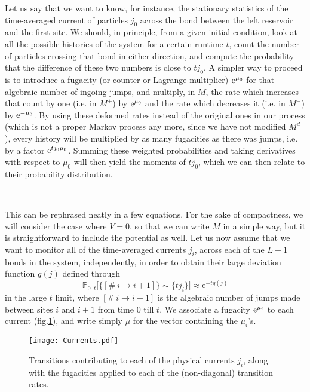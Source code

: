 \documentclass[aps,pre,onecolumn,showpacs,showkeys,a4paper]{revtex4-1}
\begin{document}
Let us say that we want to know, for instance, the stationary statistics of the time-averaged current of particles $j_0$ across the bond between the left reservoir and the first site. We should, in principle, from a given initial condition, look at all the possible histories of the system for a certain runtime $t$, count the number of particles crossing that bond in either direction, and compute the probability that the difference of these two numbers is close to $t j_0$. A simpler way to proceed is to introduce a fugacity (or counter or Lagrange multiplier) ${\rm e}^{\mu_0}$ for that algebraic number of ingoing jumps, and multiply, in $M$, the rate which increases that count by one (i.e. in $M^+$) by ${\rm e}^{\mu_0}$ and the rate which decreases it (i.e. in $M^-$) by ${\rm e}^{-\mu_0}$. By using these deformed rates instead of the original ones in our process (which is not a proper Markov process any more, since we have not modified $M^d$), every history will be multiplied by as many fugacities as there was jumps, i.e. by a factor ${\rm e}^{t j_0 \mu_0}$. Summing these weighted probabilities and taking derivatives with respect to $\mu_0$ will then yield the moments of $t j_0$, which we can then relate to their probability distribution.

~

This can be rephrased neatly in a few equations. For the sake of compactness, we will consider the case where $V=0$, so that we can write $M$ in a simple way, but it is straightforward to include the potential as well. Let us now assume that we want to monitor all of the time-averaged currents $j_i$, across each of the $L+1$ bonds in the system, independently, in order to obtain their large deviation function $g(j)$ defined through
\begin{equation}
\mathbb{P}_{0..t}\bigl[\{[\#~i\rightarrow i+1]\}\sim \{tj_i\}\bigr]\approx \mathrm{e}^{-tg(j)}
\end{equation}
in the large $t$ limit, where $[\#~i\rightarrow i+1]$ is the algebraic number of jumps made between sites $i$ and $i+1$ from time $0$ till $t$. We associate a fugacity ${\rm e}^{\mu_i}$ to each current (fig.\ref{Currents}), and write simply $\mu$ for the vector containing the $\mu_i$'s.

\begin{figure}[ht]
\begin{center}
 \texttt{[image: Currents.pdf]}
  \caption{Transitions contributing to each of the physical currents $j_i$, along with the fugacities applied to each of the (non-diagonal) transition rates.}
\label{Currents}
 \end{center}
 \end{figure}
\end{document}
